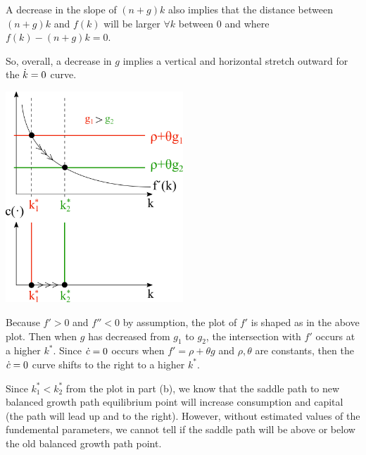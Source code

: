 \documentclass[12pt]{article}
\begin{document}
A decrease in the slope of $(n+g)k$ also implies that the distance between $(n+g)k$ and $f(k)$ will be larger $\forall k$ between 0 and where $f(k)-(n+g)k=0$.

\noindent
So, overall, a decrease in $g$ implies a vertical and horizontal stretch outward for the $\dot k = 0$ curve.


\newpage{}

\includegraphics[width=0.5\textwidth]{1.b}

Because $f'>0$ and $f''<0$ by assumption, the plot of $f'$ is shaped as in the above plot. Then when $g$ has decreased from $g_1$ to $g_2$, the intersection with $f'$ occurs at a higher $k^*$. Since $\dot c=0$ occurs when $f'=\rho+\theta g$ and $\rho, \theta$ are constants, then the $\dot c=0$ curve shifts to the right to a higher $k^*$.
  

\newpage{}

Since $k_1^* < k_2^*$ from the plot in part (b), we know that the saddle path to new balanced growth path equilibrium point will increase consumption and capital (the path will lead up and to the right). However, without estimated values of the fundemental parameters, we cannot tell if the saddle path will be above or below the old balanced growth path point.
\end{document}
